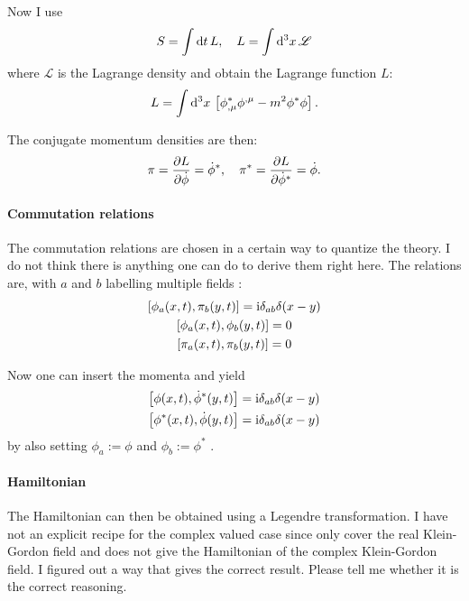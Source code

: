\documentclass[11pt, english, fleqn, DIV=15, headinclude, BCOR=1cm]{scrartcl}
\begin{document}
Now I use
\begin{equation}
    S = \int \mathop{}\!\mathrm d t \, L
    ,\quad
    L = \int \mathop{}\!\mathrm d^3 x \, \mathscr L
\end{equation}
where $\mathscr L$ is the Lagrange density and obtain the Lagrange function
$L$:
\begin{equation}
    L = \int \mathop{}\!\mathrm d^3 x \, \left[ 
        \phi^*_{,\mu} \phi^{,\mu} - m^2 \phi^* \phi
     \right].
\end{equation}

The conjugate momentum densities are then:
\begin{equation}
    \pi = \frac{\partial {L}}{\partial {\dot \phi}} = \dot \phi^{*}
    ,\quad
    \pi^* = \frac{\partial {L}}{\partial {\dot \phi^*}} = \dot \phi.
\end{equation}

\paragraph{Commutation relations}

The commutation relations are chosen in a certain way to quantize the theory. I
do not think there is anything one can do to derive them right here. The
relations are, with $a$ and $b$ labelling multiple fields
\parencite[(12.3.1)]{Schwabl/Quantenmechanik_fuer_Fortgeschrittene/2008}:
\begin{gather*}
    \left[ \phi_a(x, t), \pi_b(y, t) \right] = \mathrm i \delta_{ab} \delta(x - y) \\
    \left[ \phi_a(x, t), \phi_b(y, t) \right] = 0 \\
    \left[ \pi_a(x, t), \pi_b(y, t) \right] = 0
\end{gather*}

Now one can insert the momenta and yield
\begin{gather*}
    \left[ \phi(x, t), \dot\phi^*(y, t) \right] = \mathrm i \delta_{ab} \delta(x - y) \\
    \left[ \phi^*(x, t), \dot\phi(y, t) \right] = \mathrm i \delta_{ab} \delta(x - y)
\end{gather*}
by also setting $\phi_a := \phi$ and $\phi_b := \phi^*$
\parencite[(13.2.4)]{Schwabl/Quantenmechanik_fuer_Fortgeschrittene/2008}.

\paragraph{Hamiltonian}

The Hamiltonian can then be obtained using a Legendre transformation. I have
not an explicit recipe for the complex valued case since
\textcite[Chapter~2]{Peskin/QFT/1995} only cover the real Klein-Gordon field
and \textcite[Chapter~13.2]{Schwabl/Quantenmechanik_fuer_Fortgeschrittene/2008}
does not give the Hamiltonian of the complex Klein-Gordon field. I figured out
a way that gives the correct result. Please tell me whether it is the correct
reasoning.
\end{document}

